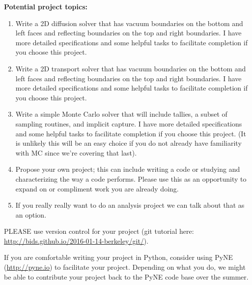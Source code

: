 \documentclass[12pt]{article}
\begin{document}
\clearpage 
\begin{center}
\textbf{Potential project topics:}
\end{center}

\begin{enumerate}
\item Write a 2D diffusion solver that has vacuum boundaries on the bottom and left faces and reflecting boundaries on the top and right boundaries. I have more detailed specifications and some helpful tasks to facilitate completion if you choose this project. 

\item Write a 2D transport solver that has vacuum boundaries on the bottom and left faces and reflecting boundaries on the top and right boundaries. I have more detailed specifications and some helpful tasks to facilitate completion if you choose this project.

\item Write a simple Monte Carlo solver that will include tallies, a subset of sampling routines, and implicit capture. I have more detailed specifications and some helpful tasks to facilitate completion if you choose this project. (It is unlikely this will be an easy choice if you do not already have familiarity with MC since we're covering that last).

\item Propose your own project; this can include writing a code or studying and characterizing the way a code performs. Please use this as an opportunity to expand on or compliment work you are already doing.

\item If you really really want to do an analysis project we can talk about that as an option.
\end{enumerate}

\vspace*{1 em}
PLEASE use version control for your project (git tutorial here: \url{http://bids.github.io/2016-01-14-berkeley/git/}). 

\vspace*{1 em}
If you are comfortable writing your project in Python, consider using PyNE (\url{http://pyne.io}) to facilitate your project. Depending on what you do, we might be able to contribute your project back to the PyNE code base over the summer.
\end{document}
